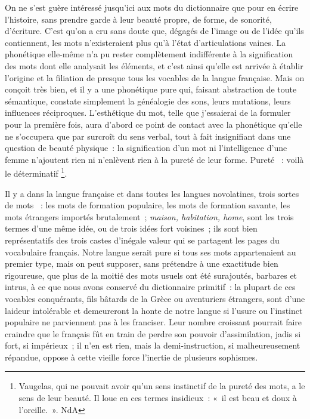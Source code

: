 \documentclass[french,twoside]{book} %
\newcommand\chaptercont{} %
\begin{document}
\chaptercont
\noindent On ne s’est guère intéressé jusqu’ici aux mots du dictionnaire que pour en écrire l’histoire, sans prendre garde à leur beauté propre, de forme, de sonorité, d’écriture. C’est qu’on a cru sans doute que, dégagés de l’image ou de l’idée qu’ils contiennent, les mots n’existeraient plus qu’à l’état d’articulations vaines. La phonétique elle-même n’a pu rester complètement indifférente à la signification des mots dont elle analysait les éléments, et c’est ainsi qu’elle est arrivée à établir l’origine et la filiation de presque tous les vocables de la langue française. Mais on conçoit très bien, et il y a une phonétique pure qui, faisant abstraction de toute sémantique, constate simplement la généalogie des sons, leurs mutations, leurs influences réciproques. L’esthétique du mot, telle que j’essaierai de la formuler pour la première fois, aura d’abord ce point de contact avec la phonétique qu’elle ne s’occupera que par surcroît du sens verbal, tout à fait insignifiant dans une question de beauté physique : la signification d’un mot ni l’intelligence d’une femme n’ajoutent rien ni n’enlèvent rien à la pureté de leur forme. Pureté  : voilà le déterminatif \footnote{Vaugelas, qui ne pouvait avoir qu’un sens instinctif de la pureté des mots, a le sens de leur beauté. Il loue en ces termes insidieux : « il est beau et doux à l’oreille. ». NdA}.\par
Il y a dans la langue française et dans toutes les langues novolatines, trois sortes de mots  : les mots de formation populaire, les mots de formation savante, les mots étrangers importés brutalement ; {\itshape maison, habitation, home}, sont les trois termes d’une même idée, ou de trois idées fort voisines ; ils sont bien représentatifs des trois castes d’inégale valeur qui se partagent les pages du vocabulaire français. Notre langue serait pure si tous ses mots appartenaient au premier type, mais on peut supposer, sans prétendre à une exactitude bien rigoureuse, que plus de la moitié des mots usuels ont été surajoutés, barbares et intrus, à ce que nous avons conservé du dictionnaire primitif : la plupart de ces vocables conquérants, fils bâtards de la Grèce ou aventuriers étrangers, sont d’une laideur intolérable et demeureront la honte de notre langue si l’usure ou l’instinct populaire ne parviennent pas à les franciser. Leur nombre croissant pourrait faire craindre que le français fût en train de perdre son pouvoir d’assimilation, jadis si fort, si impérieux ; il n’en est rien, mais la demi-instruction, si malheureusement répandue, oppose à cette vieille force l’inertie de plusieurs sophismes.\par
\end{document}

